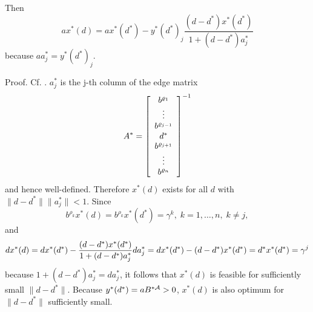 Then
\[
ax^*(d) = ax^*(d^*) - y^*(d^*)_j\frac{(d - d^*)x^*(d^*)}{1 + (d - d^*)a^*_j}
\]
because $aa^*_j = y^*(d^*)_j$.
\par
%
Proof. Cf. \cite{BeRi1}. $a^*_j$ is the j-th column of the edge matrix
\[
A^* = \ba{[}{c}b^{\rho _1}\\ \vdots \\ b^{\rho _{j-1}} \\ d^*
\\ b^{\rho _{j+1}}\\ \vdots \\ b^{\rho _n}\ea{]}^{-1}
\]
and hence well-defined. Therefore $x^*(d)$ exists for all $d$ with $\|d -
d^*\|\|a^*_j\| < 1$. Since
\[
b^{\rho _k}x^*(d) = b^{\rho _k}x^*(d^*) = \gamma ^k, \; k = 1, \ldots, n, \; k
\neq j,
\]
and
\[
dx^*(d)
= \dis  dx^*(d^*) -
\frac{(d - d^*)x^*(d^*)}{1 + (d - d^*)a^*_j}da^*_j
= dx^*(d^*) - (d - d^*)x^*(d^*)
= d^*x^*(d^*) = \gamma ^j
\]
because $ 1 + (d - d^*)a^*_j = da^*_j$, it follows that $x^*(d)$ is feasible
for sufficiently small $\|d - d^*\|$.  Because $y^*(d^*) = aB^{*\A} > 0$,
$x^*(d)$ is also optimum for $\|d - d^*\|$ sufficiently small.
